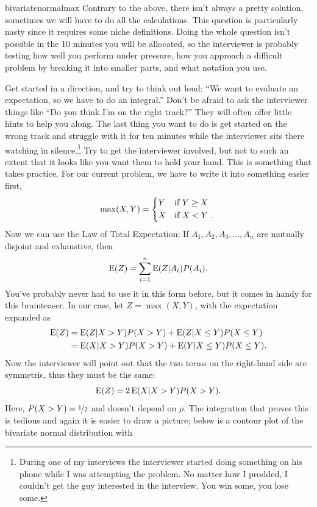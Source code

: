 \begin{answer}{bivariatenormalmax}
Contrary to the above, there isn't always a pretty solution, sometimes we will have to do all the calculations.
This question is particularly nasty since it requires some niche definitions.
Doing the whole question isn't possible in the 10 minutes you will be allocated, so the interviewer is probably testing how well you perform under pressure,
how you approach a difficult problem by breaking it into smaller parts,
and what notation you use.

Get started in a direction, and try to think out loud:
``We want to evaluate an expectation, so we have to do an integral.''
Don't be afraid to ask the interviewer things like ``Do you think I'm on the right track?''
They will often offer little hints to help you along.
The last thing you want to do is get started on the wrong track and struggle with it for ten minutes while the interviewer sits there watching in silence.\footnote{During one of my interviews the interviewer started doing something on his phone while I was attempting the problem. No matter how I prodded, I couldn't get the guy interested in the interview. You win some, you lose some.}
Try to get the interviewer involved, but not to such an extent that it looks like you want them to hold your hand.
This is something that takes practice.
For our current problem, we have to write it into something easier first,
\[
  \max(X, Y) =
  \begin{dcases*}
    Y & if $Y \geq X$\\
    X & if $X < Y$
  \text{.}
  \end{dcases*}
\]
Now we can use the Law of Total Expectation:
If $ A_1, A_2, A_3, \ldots, A_n$ are mutually disjoint and exhaustive, then
\[
  \operatorname{\mathrm{E}}(Z) = \sum_{i=1}^{n}{
    \operatorname{\mathrm{E}}(Z| A_i)P(A_i)
  }
  \text{.}
\]
You've probably never had to use it in this form before, but it comes in handy for this brainteaser.
In our case, let $Z=\max(X,Y)$, with the expectation expanded as
\begin{align*}
  \operatorname{\mathrm{E}}(Z) &= \operatorname{\mathrm{E}}(Z|X > Y)P(X>Y)
+          \operatorname{\mathrm{E}}(Z|X \leq Y)P(X \leq Y) \\
        &= \operatorname{\mathrm{E}}(X|X > Y)P(X>Y)
+          \operatorname{\mathrm{E}}(Y|X \leq Y)P(X \leq Y)
  \text{.}
\end{align*}
Now the interviewer will point out that the two terms on the right-hand side are symmetric, thus they must be the same:
\[
  \operatorname{\mathrm{E}}(Z) = 2 \operatorname{\mathrm{E}}(X|X > Y)P(X>Y)
  \text{.}
\]
Here, $P(X>Y) = \nicefrac{1}{2}$ and doesn't depend on $\rho$.
The integration that proves this is tedious and again it is easier to draw a picture; below is a contour plot of the bivariate normal distribution with

\end{answer}
